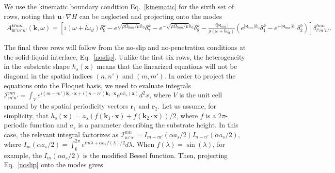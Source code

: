 \documentclass[aps,pre,amsmath,amssymb,floatfix,onecolumn,notitlepage,10pt]{revtex4-1}
\begin{document}
We use the kinematic boundary condition Eq.~\eqref{kinematic} for the sixth set of rows, noting that $\mathbf{u}\cdot\nabla H$ can be neglected and projecting onto the modes
\begin{align}
A^{klmn}_{6l'm'n'}(\mathbf{k}, \omega) = \left[i(\omega+l\omega_d)\delta^k_9 - e^{\sqrt{\rho\Omega_{lmn}/\mu}h_0}\delta^k_7 - e^{-\sqrt{\rho\Omega_{lmn}/\mu}h_0} \delta^k_8 - \frac{i|\bm{\kappa}_{mn}|}{\rho(\omega+l\omega_d)}(e^{|\bm{\kappa}_{mn}|h_0}\delta^k_1 - e^{-|\bm{\kappa}_{mn}|h_0}\delta^k_2)\right]\delta^{lmn}_{l'm'n'}. \label{lkinematic}
\end{align}

The final three rows will follow from the no-slip and no-penetration conditions at the solid-liquid interface, Eq.~\eqref{noslip}. Unlike the first six rows, the heterogeneity in the substrate shape $h_s(\mathbf{x})$ means that the linearized equations will not be diagonal in the spatial indices $(n,n')$ and $(m,m')$. In order to project the equations onto the Floquet basis, we need to evaluate integrals $\mathcal{I}_{m'n'}^{mn} =\int_V e^{i(m-m')\mathbf{k}_1\cdot\mathbf{x}+i(n-n')\mathbf{k}_2\cdot\mathbf{x}}e^{\alpha h_s(\mathbf{x})} d^2x$, where $V$ is the unit cell spanned by the spatial periodicity vectors $\mathbf{r}_1$ and $\mathbf{r}_2$. Let us assume, for simplicity, that $h_s(\mathbf{x}) = a_s(f(\mathbf{k}_1\cdot \mathbf{x})+f(\mathbf{k}_2\cdot \mathbf{x}))/2$, where $f$ is a $2\pi$-periodic function and $a_s$ is a parameter describing the substrate height. In this case, the relevant integral factorizes as $\mathcal{I}_{m'n'}^{mn}  = I_{m-m'}(\alpha a_s/2)I_{n-n'}(\alpha a_s/2)$, where $I_{m}(\alpha a_s/2)=\int_0^{2\pi} e^{im\lambda+\alpha a_s f(\lambda)/2} d\lambda$. When $f(\lambda)=\sin(\lambda)$, for example, the $I_{m}(\alpha a_s/2)$ is the modified Bessel function. Then, projecting Eq.~\eqref{noslip} onto the modes gives
\end{document}
